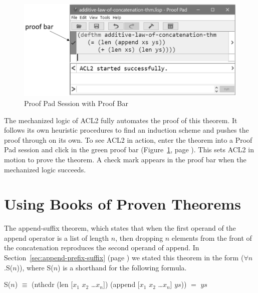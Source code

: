 \begin{figure}
\begin{center}
\includegraphics[scale=0.55]{images/additive-law-of-concatenation-thm-acl2-prf-bw.png}
\end{center}
\caption{Proof Pad Session with Proof Bar}
\label{fig:proof-bar-with-chk}
\end{figure}

The mechanized logic of ACL2 fully automates the proof of this theorem.
It follows its own heuristic procedures to find an induction scheme
and pushes the proof through on its own.
To see ACL2 in action, enter the theorem into a Proof Pad session
and click in the green proof bar
(Figure~\ref{fig:proof-bar-with-chk}, page \pageref{fig:proof-bar-with-chk}).
This sets ACL2 in motion to prove the theorem.
A check mark appears in the proof bar
when the mechanized logic succeeds.

\section{Using Books of Proven Theorems}
\label{sec:using-books-of-proven-theorems}

The append-suffix theorem, which states that
when the first operand of the append operator is a list of length $n$,
then dropping $n$ elements from the front of the concatenation
reproduces the second operand of append.
In Section~\ref{sec:append-prefix-suffix} (page \pageref{append-suffix-thm-pencil-proof})
we stated this theorem in the form ($\forall$$n$.S($n$)),
where S($n$) is a shorthand for the following formula.

\begin{samepage}
\begin{center}
S($n$) $\equiv$ (nthcdr (len [$x_1$ $x_2$ \dots $x_n$]) (append [$x_1$ $x_2$ \dots $x_n$] $ys$)) $=$ $ys$
\end{center}
\end{samepage}

